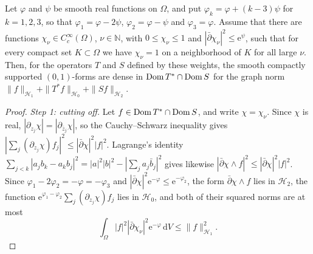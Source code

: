 \begin{lemma}\label{lem:three-weight-density}
Let $\varphi$ and $\psi$ be smooth real functions on $\Omega$, and put $\varphi_k=\varphi+(k-3)\psi$ for $k=1,2,3$, so that $\varphi_1=\varphi-2\psi$, $\varphi_2=\varphi-\psi$ and $\varphi_3=\varphi$. Assume that there are functions $\chi_\nu\in C_c^\infty(\Omega)$, $\nu\in\mathbb N$, with $0\le\chi_\nu\le1$ and $|\bar\partial\chi_\nu|^2\le\mathrm e^\psi$, such that for every compact set $K\subset\Omega$ we have $\chi_\nu=1$ on a neighborhood of $K$ for all large $\nu$. Then, for the operators $T$ and $S$ defined by these weights, the smooth compactly supported $(0,1)$-forms are dense in $\operatorname{Dom} T^*\cap\operatorname{Dom} S$ for the graph norm $\|f\|_{\mathcal H_1}+\|T^*f\|_{\mathcal H_0}+\|Sf\|_{\mathcal H_2}$.
\end{lemma}
\begin{proof}
\emph{Step 1: cutting off.} Let $f\in\operatorname{Dom} T^*\cap\operatorname{Dom} S$, and write $\chi=\chi_\nu$. Since $\chi$ is real, $|\partial_{z_j}\chi|=|\partial_{\bar z_j}\chi|$, so the Cauchy--Schwarz inequality gives $|\sum_j(\partial_{z_j}\chi)f_j|^2\le|\bar\partial\chi|^2|f|^2$. Lagrange's identity $\sum_{j<k}|a_jb_k-a_kb_j|^2=|a|^2|b|^2-|\sum_ja_j\bar b_j|^2$ gives likewise $|\bar\partial\chi\wedge f|^2\le|\bar\partial\chi|^2|f|^2$. Since $\varphi_1-2\varphi_2=-\varphi=-\varphi_3$ and $|\bar\partial\chi|^2\mathrm e^{-\varphi}\le\mathrm e^{-\varphi_2}$, the form $\bar\partial\chi\wedge f$ lies in $\mathcal H_2$, the function $\mathrm e^{\varphi_1-\varphi_2}\sum_j(\partial_{z_j}\chi)f_j$ lies in $\mathcal H_0$, and both of their squared norms are at most
\begin{equation}\label{eq:three-weight-cutoff-error}
 \int_\Omega|f|^2|\bar\partial\chi_\nu|^2\mathrm e^{-\varphi}\,\mathrm dV\le\|f\|_{\mathcal H_1}^2.
\end{equation}


\end{proof}
